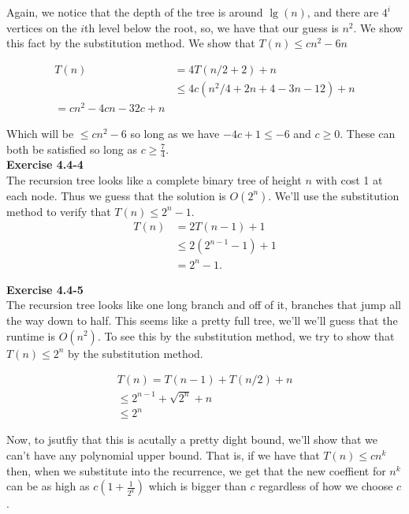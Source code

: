 \documentclass{article}
\begin{document}
Again, we notice that the depth of the tree is around $\lg(n)$, and there are $4^i$ vertices on the $i$th level below the root, so, we have that our guess is $n^2$. We show this fact by the substitution method. We show that $T(n) \le cn^2 -6n$

\begin{align*}
T(n)  &=4T(n/2+2)+n\\
&\le4c(n^2/4 + 2n + 4 - 3n-12) + n\\
=cn^2 - 4cn-32c + n
\end{align*}

Which will be $\le cn^2-6$ so long as we have $-4c+1 \le -6$ and $c\ge0$. These can both be satisfied so long as $c\ge \frac{7}{4}$.\\

\noindent\textbf{Exercise 4.4-4}\\

The recursion tree looks like a complete binary tree of height $n$ with cost 1 at each node.  Thus we guess that the solution is $O(2^n)$.  We'll use the substitution method to verify that $T(n) \leq 2^n - 1$. 
\begin{align*}
T(n) &= 2T(n-1) + 1 \\
&\leq 2(2^{n-1} - 1) + 1 \\
&= 2^n - 1.
\end{align*}

\noindent\textbf{Exercise 4.4-5}\\

The recursion tree looks like one long branch and off of it, branches that jump all the way down to half. This seems like a pretty full tree, we'll we'll guess that the runtime is $O(n^2)$. To see this by the substitution method, we try to show that $T(n)\le 2^n$ by the substitution method.

\begin{align*}
T(n) = T(n-1) + T(n/2) + n\\
\le 2^{n-1} + \sqrt{2^{n}} + n\\
\le 2^{n}
\end{align*}

Now, to jsutfiy that this is acutally a pretty dight bound, we'll show that we can't have any polynomial upper bound. That is, if we have that $T(n)\le cn^k$ then, when we substitute into the recurrence, we get that the new coeffient for $n^k$ can be as high as $c(1+\frac{1}{2^k})$ which is bigger than $c$ regardless of how we choose $c$.\\ 
\end{document}
